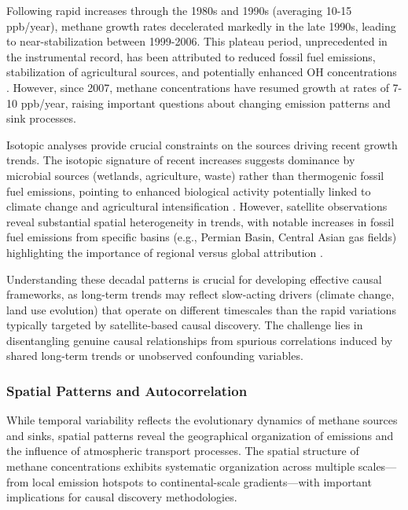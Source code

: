 Following rapid increases through the 1980s and 1990s (averaging 10-15 ppb/year), methane growth rates decelerated markedly in the late 1990s, leading to near-stabilization between 1999-2006. This plateau period, unprecedented in the instrumental record, has been attributed to reduced fossil fuel emissions, stabilization of agricultural sources, and potentially enhanced OH concentrations \cite{Karoff2023}. However, since 2007, methane concentrations have resumed growth at rates of 7-10 ppb/year, raising important questions about changing emission patterns and sink processes.

Isotopic analyses provide crucial constraints on the sources driving recent growth trends. The isotopic signature of recent increases suggests dominance by microbial sources (wetlands, agriculture, waste) rather than thermogenic fossil fuel emissions, pointing to enhanced biological activity potentially linked to climate change and agricultural intensification \cite{Shindell2012}. However, satellite observations reveal substantial spatial heterogeneity in trends, with notable increases in fossil fuel emissions from specific basins (e.g., Permian Basin, Central Asian gas fields) highlighting the importance of regional versus global attribution \cite{Zhang2020, irakulis_loitxate_satellites_2022}.

Understanding these decadal patterns is crucial for developing effective causal frameworks, as long-term trends may reflect slow-acting drivers (climate change, land use evolution) that operate on different timescales than the rapid variations typically targeted by satellite-based causal discovery. The challenge lies in disentangling genuine causal relationships from spurious correlations induced by shared long-term trends or unobserved confounding variables.

\subsubsection{Spatial Patterns and Autocorrelation}

While temporal variability reflects the evolutionary dynamics of methane sources and sinks, spatial patterns reveal the geographical organization of emissions and the influence of atmospheric transport processes. The spatial structure of methane concentrations exhibits systematic organization across multiple scales—from local emission hotspots to continental-scale gradients—with important implications for causal discovery methodologies.

